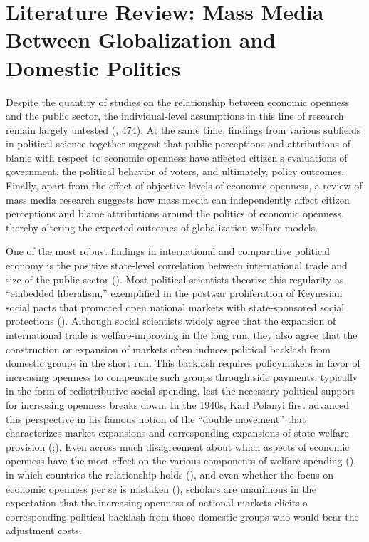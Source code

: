 \documentclass[12pt]{report}
\begin{document}
\section{Literature Review: Mass Media Between Globalization and Domestic Politics}

Despite the quantity of studies on the relationship between economic openness and the public sector,
the individual-level assumptions in this line of research remain largely untested
(\citealt{Hays:2005vo}, 474). At the same time, findings from various subfields in political science
together suggest that public perceptions and attributions of blame with respect to economic openness
have affected citizen's evaluations of government, the political behavior of voters, and ultimately,
policy outcomes. Finally, apart from the effect of objective levels of economic openness, a review
of mass media research suggests how mass media can independently affect citizen perceptions and
blame attributions around the politics of economic openness, thereby altering the expected outcomes
of globalization-welfare models.

One of the most robust findings in international and comparative political economy is the positive
state-level correlation between international trade and size of the public sector
(\citealt{Cameron:1978vb,Rodrik:1998te,Garrett:1995tj,Adsera:2002vt}). Most political scientists
theorize this regularity as ``embedded liberalism,'' exemplified in the postwar
proliferation of Keynesian social pacts that promoted open national markets with state-sponsored
social protections (\citealt{Ruggie:1982wx}). Although social scientists widely agree that the
expansion of international trade is welfare-improving in the long run, they also agree that the
construction or expansion of markets often induces political backlash from domestic groups in the
short run. This backlash requires policymakers in favor of increasing openness to compensate such
groups through side payments, typically in the form of redistributive social spending, lest the
necessary political support for increasing openness breaks down. In the 1940s, Karl Polanyi first
advanced this perspective in his famous notion of the ``double movement'' that
characterizes market expansions and corresponding expansions of state welfare provision
(\citealt[79, 385]{Polanyi:2001vc};). Even across much disagreement about which aspects of economic
openness have the most effect on the various components of welfare spending
(\citealt{Mares:2004el,Ansell:2008wl,Burgoon:2001dp}), in which countries the relationship holds
(\citealt{Rudra:2002ui}), and even whether the focus on economic openness per se is
mistaken (\citealt{Kim:2007wu,Oatley:2011hv}), scholars are unanimous in the expectation that the
increasing openness of national markets elicits a corresponding political backlash from those
domestic groups who would bear the adjustment costs.
\end{document}
